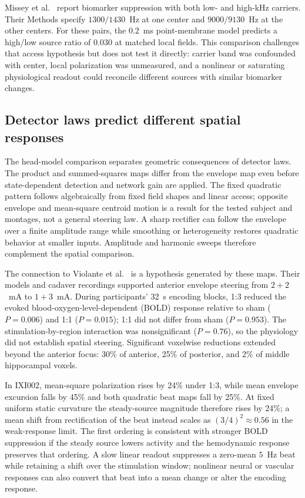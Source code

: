 \documentclass[11pt,a4paper]{article}
\begin{document}
\fi

Missey et al.\ \cite{missey2026} report biomarker suppression with both
low- and high-kHz carriers. Their Methods specify $1300/1430$~Hz at one
center and $9000/9130$~Hz at the other centers. For these pairs, the
$0.2$~ms point-membrane model predicts a high/low source ratio of $0.030$
at matched local fields. This comparison challenges that access hypothesis
but does not test it directly: carrier band was confounded with center,
local polarization was unmeasured, and a nonlinear or saturating physiological
readout could reconcile different sources with similar biomarker changes.

\subsection{Detector laws predict different spatial responses}
The head-model comparison separates geometric consequences of detector laws.
The product and summed-squares maps differ from the envelope map even before
state-dependent detection and network gain are applied. The fixed quadratic
pattern follows algebraically from fixed field shapes and linear access;
opposite envelope and mean-square centroid motion is a result for the tested
subject and montages, not a general steering law. A sharp rectifier can follow
the envelope over a finite amplitude range while smoothing or heterogeneity
restores quadratic behavior at smaller inputs. Amplitude and harmonic sweeps
therefore complement the spatial comparison.

The connection to Violante et al.\ \cite{violante2023} is a hypothesis generated
by these maps. Their models and cadaver recordings supported anterior envelope
steering from $2+2$~mA to $1+3$~mA. During participants' 32~s encoding blocks,
1:3 reduced the evoked blood-oxygen-level-dependent (BOLD) response relative
to sham ($P=0.006$) and 1:1 ($P=0.015$); 1:1 did not differ from sham
($P=0.953$). The stimulation-by-region interaction was nonsignificant
($P=0.76$), so the physiology did not establish spatial steering. Significant
voxelwise reductions extended beyond the anterior focus: 30\% of anterior,
25\% of posterior, and 2\% of middle hippocampal voxels.

In IXI002, mean-square polarization rises by 24\% under 1:3, while mean
envelope excursion falls by 45\% and both quadratic beat maps fall by 25\%.
At fixed uniform static curvature the steady-source magnitude therefore rises
by 24\%; a mean shift from rectification of the beat instead scales as
$(3/4)^2\approx0.56$ in the weak-response limit. The first ordering is
consistent with stronger BOLD suppression if the steady source lowers activity
and the hemodynamic response preserves that ordering. A slow linear readout
suppresses a zero-mean $5$~Hz beat while retaining a shift over the stimulation
window; nonlinear neural or vascular responses can also convert that beat into
a mean change or alter the encoding response.
\end{document}
